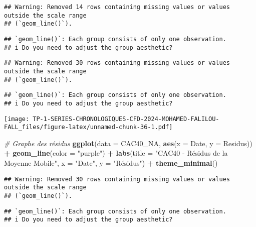 \documentclass[
]{article}
\newenvironment{Shaded}{\begin{snugshade}}{\end{snugshade}}
\newcommand{\AttributeTok}[1]{\textcolor[rgb]{0.13,0.29,0.53}{#1}}
\newcommand{\CommentTok}[1]{\textcolor[rgb]{0.56,0.35,0.01}{\textit{#1}}}
\newcommand{\FunctionTok}[1]{\textcolor[rgb]{0.13,0.29,0.53}{\textbf{#1}}}
\newcommand{\NormalTok}[1]{#1}
\newcommand{\SpecialCharTok}[1]{\textcolor[rgb]{0.81,0.36,0.00}{\textbf{#1}}}
\newcommand{\StringTok}[1]{\textcolor[rgb]{0.31,0.60,0.02}{#1}}
\begin{document}
\begin{verbatim}
## Warning: Removed 14 rows containing missing values or values outside the scale range
## (`geom_line()`).
\end{verbatim}

\begin{verbatim}
## `geom_line()`: Each group consists of only one observation.
## i Do you need to adjust the group aesthetic?
\end{verbatim}

\begin{verbatim}
## Warning: Removed 30 rows containing missing values or values outside the scale range
## (`geom_line()`).
\end{verbatim}

\begin{verbatim}
## `geom_line()`: Each group consists of only one observation.
## i Do you need to adjust the group aesthetic?
\end{verbatim}

\texttt{[image: TP-1-SERIES-CHRONOLOGIQUES-CFD-2024-MOHAMED-FALILOU-FALL\_files/figure-latex/unnamed-chunk-36-1.pdf]}

\begin{Shaded}
\begin{Highlighting}[]
\CommentTok{\# Graphe des résidus}
\FunctionTok{ggplot}\NormalTok{(}\AttributeTok{data =}\NormalTok{ CAC40\_NA, }\FunctionTok{aes}\NormalTok{(}\AttributeTok{x =}\NormalTok{ Date, }\AttributeTok{y =}\NormalTok{ Residus)) }\SpecialCharTok{+}
  \FunctionTok{geom\_line}\NormalTok{(}\AttributeTok{color =} \StringTok{"purple"}\NormalTok{) }\SpecialCharTok{+}
  \FunctionTok{labs}\NormalTok{(}\AttributeTok{title =} \StringTok{"CAC40 {-} Résidus de la Moyenne Mobile"}\NormalTok{,}
       \AttributeTok{x =} \StringTok{"Date"}\NormalTok{,}
       \AttributeTok{y =} \StringTok{"Résidus"}\NormalTok{) }\SpecialCharTok{+}
  \FunctionTok{theme\_minimal}\NormalTok{()}
\end{Highlighting}
\end{Shaded}

\begin{verbatim}
## Warning: Removed 30 rows containing missing values or values outside the scale range
## (`geom_line()`).
\end{verbatim}

\begin{verbatim}
## `geom_line()`: Each group consists of only one observation.
## i Do you need to adjust the group aesthetic?
\end{verbatim}
\end{document}
